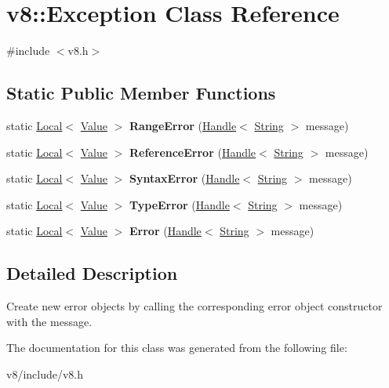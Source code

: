 \hypertarget{classv8_1_1Exception}{\section{v8\-:\-:Exception Class Reference}
\label{classv8_1_1Exception}
}


{\ttfamily \#include $<$v8.\-h$>$}

\subsection*{Static Public Member Functions}
\begin{DoxyCompactItemize}
\item 
\hypertarget{classv8_1_1Exception_a3ce2406b4aa50f8639450ec11baee26f}{static \hyperlink{classv8_1_1Local}{Local}$<$ \hyperlink{classv8_1_1Value}{Value} $>$ {\bfseries Range\-Error} (\hyperlink{classv8_1_1Handle}{Handle}$<$ \hyperlink{classv8_1_1String}{String} $>$ message)}\label{classv8_1_1Exception_a3ce2406b4aa50f8639450ec11baee26f}

\item 
\hypertarget{classv8_1_1Exception_adef7d49c3370594fbc97ee68c3fcbf29}{static \hyperlink{classv8_1_1Local}{Local}$<$ \hyperlink{classv8_1_1Value}{Value} $>$ {\bfseries Reference\-Error} (\hyperlink{classv8_1_1Handle}{Handle}$<$ \hyperlink{classv8_1_1String}{String} $>$ message)}\label{classv8_1_1Exception_adef7d49c3370594fbc97ee68c3fcbf29}

\item 
\hypertarget{classv8_1_1Exception_a938d1b571e9021121ad0f820c5e95114}{static \hyperlink{classv8_1_1Local}{Local}$<$ \hyperlink{classv8_1_1Value}{Value} $>$ {\bfseries Syntax\-Error} (\hyperlink{classv8_1_1Handle}{Handle}$<$ \hyperlink{classv8_1_1String}{String} $>$ message)}\label{classv8_1_1Exception_a938d1b571e9021121ad0f820c5e95114}

\item 
\hypertarget{classv8_1_1Exception_a61645d9d6b46cf76f2a8eccfe7039b90}{static \hyperlink{classv8_1_1Local}{Local}$<$ \hyperlink{classv8_1_1Value}{Value} $>$ {\bfseries Type\-Error} (\hyperlink{classv8_1_1Handle}{Handle}$<$ \hyperlink{classv8_1_1String}{String} $>$ message)}\label{classv8_1_1Exception_a61645d9d6b46cf76f2a8eccfe7039b90}

\item 
\hypertarget{classv8_1_1Exception_ae598e4b24cf37c9986b6ad1bed858aee}{static \hyperlink{classv8_1_1Local}{Local}$<$ \hyperlink{classv8_1_1Value}{Value} $>$ {\bfseries Error} (\hyperlink{classv8_1_1Handle}{Handle}$<$ \hyperlink{classv8_1_1String}{String} $>$ message)}\label{classv8_1_1Exception_ae598e4b24cf37c9986b6ad1bed858aee}

\end{DoxyCompactItemize}


\subsection{Detailed Description}
Create new error objects by calling the corresponding error object constructor with the message. 

The documentation for this class was generated from the following file\-:\begin{DoxyCompactItemize}
\item 
v8/include/v8.\-h\end{DoxyCompactItemize}
